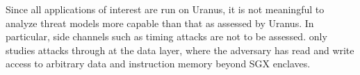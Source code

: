 Since all applications of interest are run on Uranus,
it is not meaningful to analyze threat models more capable than that as assessed by Uranus.
In particular, side channels such as timing attacks are not to be assessed.
\pname{} only studies attacks through at the data layer,
where the adversary has read and write access
to arbitrary data and instruction memory beyond \ac{SGX} enclaves.
